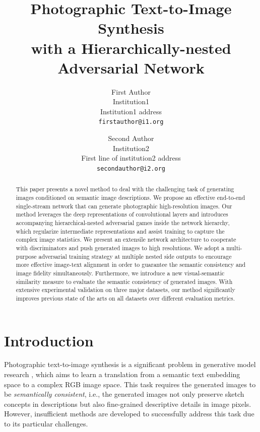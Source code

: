 \documentclass[10pt,twocolumn,letterpaper]{article}
\begin{document}
\title{Photographic Text-to-Image Synthesis \\ with a Hierarchically-nested Adversarial Network}

\author{First Author\\
Institution1\\
Institution1 address\\
{\tt\small firstauthor@i1.org}
\and
Second Author\\
Institution2\\
First line of institution2 address\\
{\tt\small secondauthor@i2.org}
}

\maketitle

\begin{abstract}
This paper presents a novel method to deal with the challenging task of generating images conditioned on semantic image descriptions. We propose an effective end-to-end single-stream network that can generate photographic high-resolution images. Our method leverages the deep representations of convolutional layers and introduces accompanying hierarchical-nested adversarial games inside the network hierarchy, which regularize intermediate representations and assist training to capture the complex image statistics. We present an extensile network architecture to cooperate with discriminators and push generated images to high resolutions. 
We adopt a multi-purpose adversarial training strategy at multiple nested side outputs to encourage more effective image-text alignment in order to guarantee the semantic consistency and image fidelity simultaneously. Furthermore, we introduce a new visual-semantic similarity measure to evaluate the semantic consistency of generated images.
With extensive experimental validation on three major datasets, our method significantly improves previous state of the arts on all datasets over different evaluation metrics. 
\end{abstract}


\section{Introduction}
Photographic text-to-image synthesis is a significant problem in generative model research \cite{reed2016generative}, which aims to learn a translation from a semantic text embedding space to a complex RGB image space. This task requires the generated images to be \textit{semantically consistent}, i.e., the generated images not only preserve sketch concepts in descriptions but also fine-grained descriptive details in image pixels. 
However, insufficient methods are developed to successfully address this task due to its particular challenges. 
\end{document}
